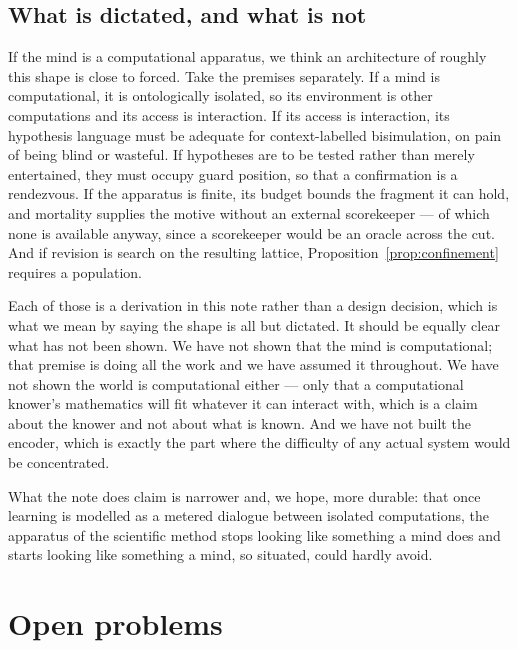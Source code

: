 \documentclass[11pt]{article}
\theoremstyle{plain}
\theoremstyle{definition}
\begin{document}
\subsection{What is dictated, and what is not}

If the mind is a computational apparatus, we think an architecture of roughly this shape is close to
forced. Take the premises separately. If a mind is computational, it is ontologically isolated, so its
environment is other computations and its access is interaction. If its access is interaction, its
hypothesis language must be adequate for context-labelled bisimulation, on pain of being blind or
wasteful. If hypotheses are to be tested rather than merely entertained, they must occupy guard
position, so that a confirmation is a rendezvous. If the apparatus is finite, its budget bounds the
fragment it can hold, and mortality supplies the motive without an external scorekeeper --- of which
none is available anyway, since a scorekeeper would be an oracle across the cut. And if revision is
search on the resulting lattice, Proposition~\ref{prop:confinement} requires a population.

Each of those is a derivation in this note rather than a design decision, which is what we mean by
saying the shape is all but dictated. It should be equally clear what has not been shown. We have not
shown that the mind is computational; that premise is doing all the work and we have assumed it
throughout. We have not shown the world is computational either --- only that a computational knower's
mathematics will fit whatever it can interact with, which is a claim about the knower and not about
what is known. And we have not built the encoder, which is exactly the part where the difficulty of
any actual system would be concentrated.

What the note does claim is narrower and, we hope, more durable: that once learning is modelled as a
metered dialogue between isolated computations, the apparatus of the scientific method stops looking
like something a mind does and starts looking like something a mind, so situated, could hardly avoid.

\section{Open problems}
\label{sec:open}
\end{document}
